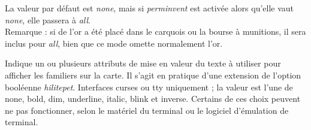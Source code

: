 \documentclass[titlepage]{article}
\begin{document}
\begin{description}[font=\mdseries\itshape]
La valeur par défaut est \textit{none}, mais si \textit{perm\textunderscore invent} est activée
alors qu'elle vaut \textit{none}, elle passera à \textit{all}.
\\
Remarque : si de l'or a été placé dans le carquois ou la bourse à munitions, il sera
inclus pour \textit{all}, bien que ce mode omette normalement l'or.
\item[petattr]
Indique un ou plusieurs attributs de mise en valeur du texte à utiliser pour afficher
les familiers sur la carte.
Il s'agit en pratique d'une extension de l'option booléenne \textit{hilite\textunderscore pet}.
Interfaces curses ou tty uniquement ; la valeur est l'une de
none, bold, dim, underline, italic, blink et inverse.
Certains de ces choix peuvent ne pas fonctionner,
selon le matériel du terminal ou le logiciel d'émulation de terminal.


\end{description}
\end{document}
